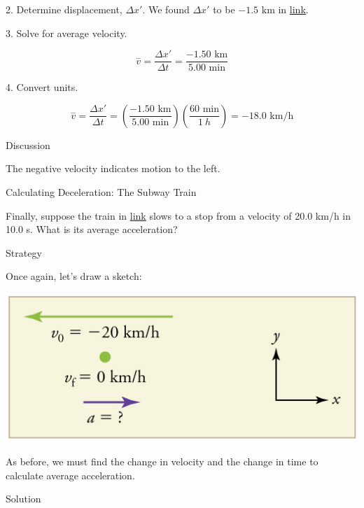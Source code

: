 \documentclass[
]{book}
\newenvironment{tinysection}{}{}
\begin{document}
2. Determine displacement, \(\Delta x\prime\). We found \(\Delta x\prime\)
to be \({- \text{1.5\ km}}{}\) in
\protect\hyperlink{fs-id1744930}{link}.

3. Solve for average velocity.

\leavevmode\hypertarget{import-auto-id2338961}{}%
\[{\overset{-}{v} = \frac{\Delta x\prime}{\Delta t}} = \frac{- \text{1.50\ km}}{\text{5.00\ min}}\]

4. Convert units.

\leavevmode\hypertarget{import-auto-id2338968}{}%
\[{{\overset{-}{v} = \frac{\Delta x\prime}{\Delta t}} = \left( \frac{{- 1}\text{.}\text{50\ km}}{5\text{.}\text{00\ min}} \right)}{\left( \frac{\text{60\ min}}{1\ h} \right) = {- \text{18}}}\text{.0\ km/h}\]

\begin{tinysection}

{Discussion}

\end{tinysection}

The negative velocity indicates motion to the left.

\hypertarget{fs-id4015260}{}
Calculating Deceleration: The Subway Train

Finally, suppose the train in
\protect\hyperlink{import-auto-id2412190}{link} slows to a stop
from a velocity of 20.0 km/h in 10.0 s. What is its average
acceleration?

\begin{tinysection}

{Strategy}

\end{tinysection}

Once again, let's draw a sketch:

\includegraphics{images/Figure_02_03_04b.jpg}

As before, we must find the change in velocity and the change in time to
calculate average acceleration.

\begin{tinysection}

{Solution}

\end{tinysection}
\end{document}
